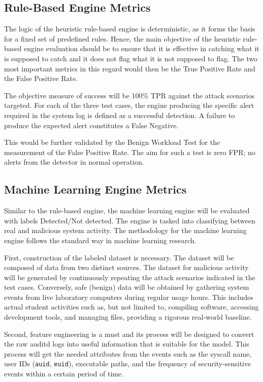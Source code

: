\documentclass[journal]{./IEEEtran}
\begin{document}
\subsection{Rule-Based Engine Metrics}
The logic of the heuristic rule-based engine is deterministic, as it forms the basis for a fixed set of predefined rules. Hence, the main objective of the heuristic rule-based engine evaluation should be to ensure that it is effective in catching what it is supposed to catch and it does not flag what it is not supposed to flag. The two most important metrics in this regard would then be the True Positive Rate and the False Positive Rate.

The objective measure of success will be 100\% TPR against the attack scenarios targeted. For each of the three test cases, the engine producing the specific alert required in the system log is defined as a successful detection. A failure to produce the expected alert constitutes a False Negative.

This would be further validated by the Benign Workload Test  for the measurement of the False Positive Rate. The aim for such a test is zero FPR; no alerts from the detector in normal operation.

\subsection{Machine Learning Engine Metrics}
Similar to the rule-based engine, the machine learning engine will be evaluated with labels Detected/Not detected. The engine is tasked into classifying between real and malicious system activity. The methodology for the machine learning engine follows the standard way in machine learning research.

First, construction of the labeled dataset is necessary. The dataset will be composed of data from two distinct sources. The dataset for malicious activity will be generated by continuously repeating the attack scenarios indicated in the test cases. Conversely, safe (benign) data will be obtained by gathering system events from live laboratory computers during regular usage hours. This includes actual student activities such as, but not limited to, compiling software, accessing development tools, and managing files, providing a rigorous real-world baseline.

Second, feature engineering is a must and its process will be designed to convert the raw auditd logs into useful information that is suitable for the model. This process will get the needed attributes from the events such as the syscall name, user IDs (\texttt{auid}, \texttt{euid}), executable paths, and the frequency of security-sensitive events within a certain period of time.
\end{document}

